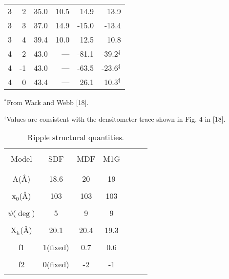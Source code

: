 \begin{table}
\begin{center}
{\begin{tabular}{rrrrrr}
3 &   2 & 35.0  &  10.5  &  14.9  &  13.9 \\
3 &   3 & 37.0  &  14.9  &  -15.0  &  -13.4 \\
3 &   4 & 39.4  &  10.0  &  12.5  &  10.8 \\
4 &  -2 & 43.0  &  ---  &  -81.1  &  -39.2$^{\ddag}$ \\
4 &  -1 & 43.0  &  ---  &  -63.5  &  -23.6$^{\ddag}$ \\
4 &   0 & 43.4  &  ---  &  26.1  &  10.3$^{\ddag}$ \\ \hline 
\end{tabular}
}
\end{center}
{\small
\indent $^{*}$From Wack and Webb [18].

\indent $^{\ddag}$Values are consistent with the densitometer trace shown in 
	Fig. 4 in [18].
}
\end{table}

\pagebreak

\begin{table}
\begin{center}
\caption{Ripple structural quantities.
\label{parameter}}
\vspace{6pt}
{\tabcolsep=0.3in
\begin{tabular}{ccccccc} 
\\ \hline \\
Model & SDF & MDF & M1G \\ \\ \hline \\
A(\AA) & 18.6 & 20  & 19 \\ \\
x$_0$(\AA) & 103 & 103 & 103 \\ \\
$\psi$($\deg$) & 5 & 9 & 9 \\ \\
X$_h$(\AA) & 20.1 & 20.4 & 19.3 \\ \\
f1 & 1(fixed) & 0.7 & 0.6 \\ \\
f2 & 0(fixed) & -2 & -1 \\ \\ \hline
\end{tabular}
}
\end{center}
\end{table}


